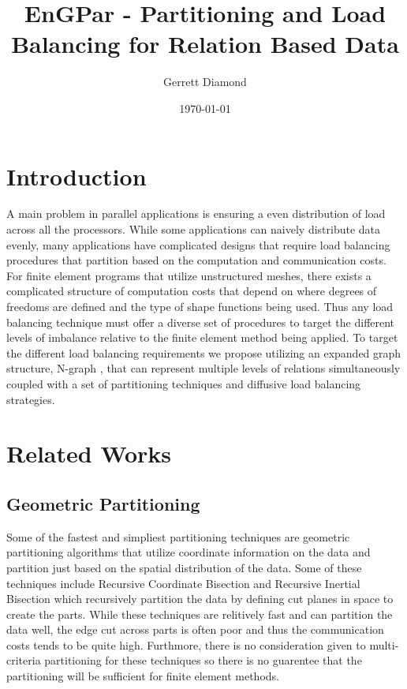 \documentclass[a4paper]{article}
\title{EnGPar - Partitioning and Load Balancing for Relation Based Data}
\author{Gerrett Diamond}
\date{\today}
\begin{document}
\maketitle

\section{Introduction}
A main problem in parallel applications is ensuring a even distribution of load across all the processors. While some applications can naively distribute data evenly, many applications have complicated designs that require load balancing procedures that partition based on the computation and communication costs. For finite element programs that utilize unstructured meshes, there exists a complicated structure of computation costs that depend on where degrees of freedoms are defined and the type of shape functions being used. Thus any load balancing technique must offer a diverse set of procedures to target the different levels of imbalance relative to the finite element method being applied. To target the different load balancing requirements we propose utilizing an expanded graph structure, N-graph \cite{EnGPar2015proposal}, that can represent multiple levels of relations simultaneously coupled with a set of partitioning techniques and diffusive load balancing strategies.

\section{Related Works}

\subsection{Geometric Partitioning}
Some of the fastest and simpliest partitioning techniques are geometric partitioning algorithms that utilize coordinate information on the data and partition just based on the spatial distribution of the data. Some of these techniques include Recursive Coordinate Bisection and Recursive Inertial Bisection \cite{williamsRIB,TaylorRIB,chevalier2012load} which recursively partition the data by defining cut planes in space to create the parts. While these techniques are relitively fast and can partition the data well, the edge cut across parts is often poor and thus the communication costs tends to be quite high. Furthmore, there is no consideration given to multi-criteria partitioning for these techniques so there is no guarentee that the partitioning will be sufficient for finite element methods.
\end{document}
